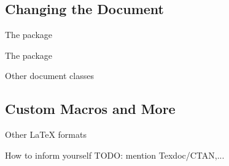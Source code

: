 \subsection{Changing the Document}
\begin{frame}{The  package}

\end{frame}

\begin{frame}{The  package}

\end{frame}

\begin{frame}{Other document classes}

\end{frame}

\subsection{Custom Macros and More}
\begin{frame}

\end{frame}

\begin{frame}{Other \LaTeX{} formats}

\end{frame}


\begin{frame}{How to inform yourself}
TODO: mention Texdoc/CTAN,...
\end{frame}

